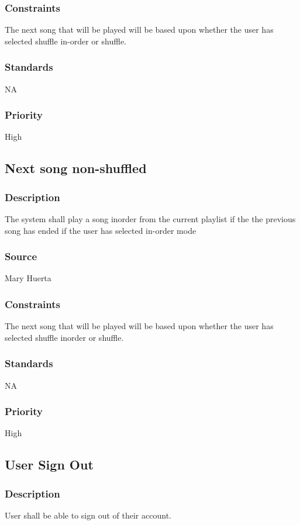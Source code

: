 \subsubsection{Constraints}
The next song that will be played will be based upon whether the user has selected shuffle in-order or shuffle.
\subsubsection{Standards}
NA
\subsubsection{Priority}
High



\subsection{Next song non-shuffled}
\subsubsection{Description}
The system shall play a song inorder from the current playlist if the the previous song has ended if the user has selected in-order mode
\subsubsection{Source}
Mary Huerta
\subsubsection{Constraints}
The next song that will be played will be based upon whether the user has selected shuffle inorder or shuffle.
\subsubsection{Standards}
NA
\subsubsection{Priority}
High



\subsection{User Sign Out}
\subsubsection{Description}
User shall be able to sign out of their account.
